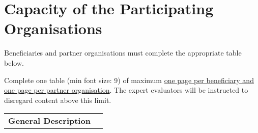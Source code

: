 \newpage
\section{Capacity of the Participating Organisations}
\label{sec:capacities}

Beneficiaries and partner organisations must complete the appropriate table below.

\medskip\noindent
Complete one table (min font size: 9) of maximum \ul{one page per beneficiary and one page per partner organisation}. 
The expert evaluators will be instructed to disregard content above this limit.
\vspace{\baselineskip}


\begin{table}[h!]
{\fontsize{9bp}{1em}\selectfont %
\noindent\begin{tabular}{|>{\raggedright}p{}|p{}|}\hline
  \multicolumn{2}{|l|}{\cellcolor{gray!50}\textbf{Beneficiary X}} \\\hline
\textbf{General Description} &


\end{tabular}}
\end{table}
